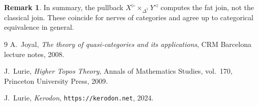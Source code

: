 \documentclass{article}
\theoremstyle{definition}
\newtheorem{remark}[proposition]{Remark}
\begin{document}
\begin{remark}
	In summary, the pullback $X^\triangleright \times_{\Delta^1} Y^\triangleleft$ computes the fat join, not the classical join. These coincide for nerves of categories and agree up to categorical equivalence in general.
\end{remark}

\begin{thebibliography}{9}
	A.~Joyal, \emph{The theory of quasi-categories and its applications}, CRM Barcelona lecture notes, 2008.

	J.~Lurie, \emph{Higher Topos Theory}, Annals of Mathematics Studies, vol.~170, Princeton University Press, 2009.

	J.~Lurie, \emph{Kerodon}, \texttt{https://kerodon.net}, 2024.
\end{thebibliography}
\end{document}
